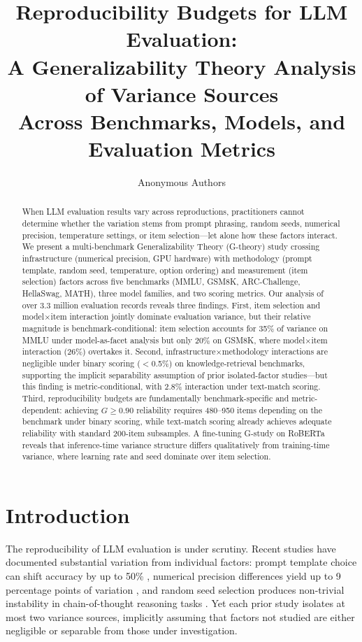 \documentclass[letterpaper,11pt]{article}
\title{Reproducibility Budgets for LLM Evaluation:\\A Generalizability Theory Analysis of Variance Sources\\Across Benchmarks, Models, and Evaluation Metrics}
\author{
Anonymous Authors
}
\begin{document}
\maketitle

\begin{abstract}
When LLM evaluation results vary across reproductions, practitioners cannot determine whether the variation stems from prompt phrasing, random seeds, numerical precision, temperature settings, or item selection---let alone how these factors interact.
We present a multi-benchmark Generalizability Theory (G-theory) study crossing infrastructure (numerical precision, GPU hardware) with methodology (prompt template, random seed, temperature, option ordering) and measurement (item selection) factors across five benchmarks (MMLU, GSM8K, ARC-Challenge, HellaSwag, MATH), three model families, and two scoring metrics.
Our analysis of over 3.3 million evaluation records reveals three findings.
First, item selection and model$\times$item interaction jointly dominate evaluation variance, but their relative magnitude is benchmark-conditional: item selection accounts for 35\% of variance on MMLU under model-as-facet analysis but only 20\% on GSM8K, where model$\times$item interaction (26\%) overtakes it.
Second, infrastructure$\times$methodology interactions are negligible under binary scoring ($<$0.5\%) on knowledge-retrieval benchmarks, supporting the implicit separability assumption of prior isolated-factor studies---but this finding is metric-conditional, with 2.8\% interaction under text-match scoring.
Third, reproducibility budgets are fundamentally benchmark-specific and metric-dependent: achieving $G\geq0.90$ reliability requires 480--950 items depending on the benchmark under binary scoring, while text-match scoring already achieves adequate reliability with standard 200-item subsamples.
A fine-tuning G-study on RoBERTa reveals that inference-time variance structure differs qualitatively from training-time variance, where learning rate and seed dominate over item selection.
\end{abstract}

\section{Introduction}

The reproducibility of LLM evaluation is under scrutiny.
Recent studies have documented substantial variation from individual factors: prompt template choice can shift accuracy by up to 50\% \citep{mizrahi2024state}, numerical precision differences yield up to 9 percentage points of variation \citep{yuan2025precisionpitfalls}, and random seed selection produces non-trivial instability in chain-of-thought reasoning tasks \citep{biderman2024lessons}.
Yet each prior study isolates at most two variance sources, implicitly assuming that factors not studied are either negligible or separable from those under investigation.
\end{document}
